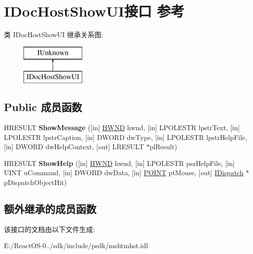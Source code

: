 \hypertarget{interface_i_doc_host_show_u_i}{}\section{I\+Doc\+Host\+Show\+U\+I接口 参考}
\label{interface_i_doc_host_show_u_i}
类 I\+Doc\+Host\+Show\+UI 继承关系图\+:\begin{figure}[H]
\begin{center}
\leavevmode
\includegraphics[height=2.000000cm]{interface_i_doc_host_show_u_i}
\end{center}
\end{figure}
\subsection*{Public 成员函数}
\begin{DoxyCompactItemize}
\item 
\mbox{\label{interface_i_doc_host_show_u_i_a2e1198571b80df51ade960bd7ce7e94c}} 
H\+R\+E\+S\+U\+LT {\bfseries Show\+Message} (\mbox{[}in\mbox{]} \hyperlink{interfacevoid}{H\+W\+ND} hwnd, \mbox{[}in\mbox{]} L\+P\+O\+L\+E\+S\+TR lpstr\+Text, \mbox{[}in\mbox{]} L\+P\+O\+L\+E\+S\+TR lpstr\+Caption, \mbox{[}in\mbox{]} D\+W\+O\+RD dw\+Type, \mbox{[}in\mbox{]} L\+P\+O\+L\+E\+S\+TR lpstr\+Help\+File, \mbox{[}in\mbox{]} D\+W\+O\+RD dw\+Help\+Context, \mbox{[}out\mbox{]} L\+R\+E\+S\+U\+LT $\ast$pl\+Result)
\item 
\mbox{\label{interface_i_doc_host_show_u_i_a525e97f7b3bd6af6ef483240107ad360}} 
H\+R\+E\+S\+U\+LT {\bfseries Show\+Help} (\mbox{[}in\mbox{]} \hyperlink{interfacevoid}{H\+W\+ND} hwnd, \mbox{[}in\mbox{]} L\+P\+O\+L\+E\+S\+TR psz\+Help\+File, \mbox{[}in\mbox{]} U\+I\+NT u\+Command, \mbox{[}in\mbox{]} D\+W\+O\+RD dw\+Data, \mbox{[}in\mbox{]} \hyperlink{structtag_p_o_i_n_t}{P\+O\+I\+NT} pt\+Mouse, \mbox{[}out\mbox{]} \hyperlink{interface_i_dispatch}{I\+Dispatch} $\ast$p\+Dispatch\+Object\+Hit)
\end{DoxyCompactItemize}
\subsection*{额外继承的成员函数}


该接口的文档由以下文件生成\+:\begin{DoxyCompactItemize}
\item 
E\+:/\+React\+O\+S-\/0../sdk/include/psdk/mshtmhst.\+idl\end{DoxyCompactItemize}
